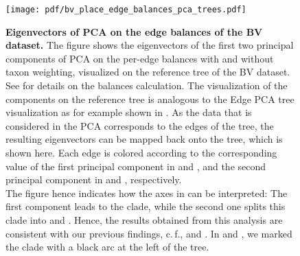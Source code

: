 \begin{figure}[!htb]
    \centering
    \texttt{[image: pdf/bv\_place\_edge\_balances\_pca\_trees.pdf]}
    \begin{subfigure}{0pt}
        \label{fig:bv_place_edge_balances_pca_trees:sub:tw_pc1}
    \end{subfigure}
    \begin{subfigure}{0pt}
        \label{fig:bv_place_edge_balances_pca_trees:sub:tw_pc2}
    \end{subfigure}
    \begin{subfigure}{0pt}
        \label{fig:bv_place_edge_balances_pca_trees:sub:no_tw_pc1}
    \end{subfigure}
    \begin{subfigure}{0pt}
        \label{fig:bv_place_edge_balances_pca_trees:sub:no_tw_pc2}
    \end{subfigure}
    \caption{
        \textbf{Eigenvectors of PCA on the edge balances of the \ac{BV} dataset.}
        The figure shows the eigenvectors of the first two principal components of PCA
        on the per-edge balances with and without taxon weighting,
        visualized on the reference tree of the \ac{BV} dataset.
        See  for details on the balances calculation.
        The visualization of the components on the reference tree is analogous
        to the Edge PCA tree visualization as for example shown in .
        As the data that is considered in the PCA corresponds to the edges of the tree,
        the resulting eigenvectors can be mapped back onto the tree, which is shown here.
        Each edge is colored according to the corresponding value of the first principal component
        in 
        and ,
        and the second principal component
        in 
        and , respectively.
        \\
        The figure hence indicates how the axes
        in  can be interpreted:
        The first component leads to the  clade,
        while the second one splits this clade into  and .
        Hence, the results obtained from this analysis are consistent with our previous findings,
        c.\,f.,  and \cite{Srinivasan2012}.
        In 
        and ,
        we marked the  clade with a black arc at the left of the tree.
    }
    \label{fig:bv_place_edge_balances_pca_trees}
\end{figure}

